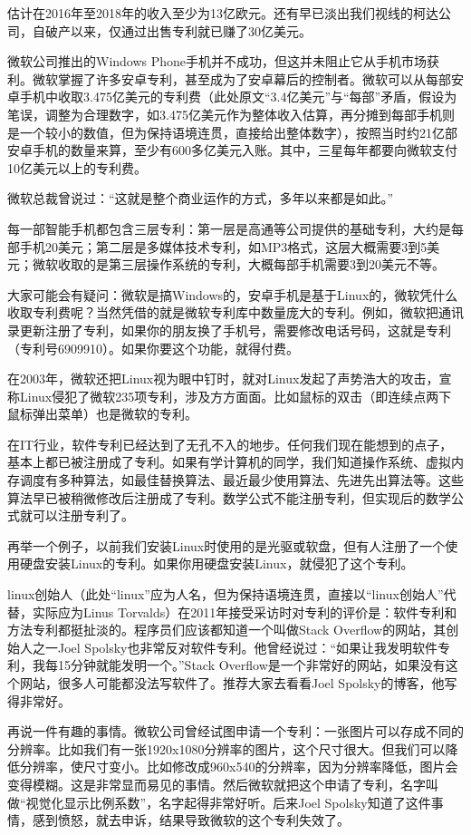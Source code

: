 \documentclass[
  letterpaper,
  DIV=11,
  numbers=noendperiod]{scrreprt}
\begin{document}
估计在2016年至2018年的收入至少为13亿欧元。还有早已淡出我们视线的柯达公司，自破产以来，仅通过出售专利就已赚了30亿美元。

微软公司推出的Windows
Phone手机并不成功，但这并未阻止它从手机市场获利。微软掌握了许多安卓专利，甚至成为了安卓幕后的控制者。微软可以从每部安卓手机中收取3.475亿美元的专利费（此处原文``3.4亿美元''与``每部''矛盾，假设为笔误，调整为合理数字，如3.475亿美元作为整体收入估算，再分摊到每部手机则是一个较小的数值，但为保持语境连贯，直接给出整体数字），按照当时约21亿部安卓手机的数量来算，至少有600多亿美元入账。其中，三星每年都要向微软支付10亿美元以上的专利费。

微软总裁曾说过：``这就是整个商业运作的方式，多年以来都是如此。''

每一部智能手机都包含三层专利：第一层是高通等公司提供的基础专利，大约是每部手机20美元；第二层是多媒体技术专利，如MP3格式，这层大概需要3到5美元；微软收取的是第三层操作系统的专利，大概每部手机需要3到20美元不等。

大家可能会有疑问：微软是搞Windows的，安卓手机是基于Linux的，微软凭什么收取专利费呢？当然凭借的就是微软专利库中数量庞大的专利。例如，微软把通讯录更新注册了专利，如果你的朋友换了手机号，需要修改电话号码，这就是专利（专利号6909910）。如果你要这个功能，就得付费。

在2003年，微软还把Linux视为眼中钉时，就对Linux发起了声势浩大的攻击，宣称Linux侵犯了微软235项专利，涉及方方面面。比如鼠标的双击（即连续点两下鼠标弹出菜单）也是微软的专利。

在IT行业，软件专利已经达到了无孔不入的地步。任何我们现在能想到的点子，基本上都已被注册成了专利。如果有学计算机的同学，我们知道操作系统、虚拟内存调度有多种算法，如最佳替换算法、最近最少使用算法、先进先出算法等。这些算法早已被稍微修改后注册成了专利。数学公式不能注册专利，但实现后的数学公式就可以注册专利了。

再举一个例子，以前我们安装Linux时使用的是光驱或软盘，但有人注册了一个使用硬盘安装Linux的专利。如果你用硬盘安装Linux，就侵犯了这个专利。

linux创始人（此处``linux''应为人名，但为保持语境连贯，直接以``linux创始人''代替，实际应为Linus
Torvalds）在2011年接受采访时对专利的评价是：软件专利和方法专利都挺扯淡的。程序员们应该都知道一个叫做Stack
Overflow的网站，其创始人之一Joel
Spolsky也非常反对软件专利。他曾经说过：``如果让我发明软件专利，我每15分钟就能发明一个。''Stack
Overflow是一个非常好的网站，如果没有这个网站，很多人可能都没法写软件了。推荐大家去看看Joel
Spolsky的博客，他写得非常好。

再说一件有趣的事情。微软公司曾经试图申请一个专利：一张图片可以存成不同的分辨率。比如我们有一张1920x1080分辨率的图片，这个尺寸很大。但我们可以降低分辨率，使尺寸变小。比如修改成960x540的分辨率，因为分辨率降低，图片会变得模糊。这是非常显而易见的事情。然后微软就把这个申请了专利，名字叫做``视觉化显示比例系数''，名字起得非常好听。后来Joel
Spolsky知道了这件事情，感到愤怒，就去申诉，结果导致微软的这个专利失效了。
\end{document}
